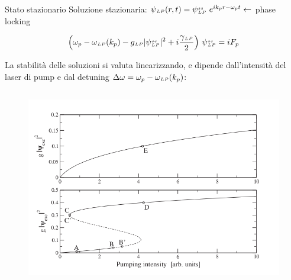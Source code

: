 \documentclass[10pt]{beamer}
\begin{document}
\begin{frame}{Stato stazionario}
%
Soluzione stazionaria: \( \psi{\scriptstyle _{LP}}(r,t) = \psi{\scriptstyle ^{ss}_{LP}} \ e^{ik_pr - \omega_p t}  \leftarrow\) \alert{phase locking}

\[
 \left( \omega_p - \omega{\scriptstyle _{LP}} (k_p) - g{\scriptstyle _{LP}} |\psi{\scriptstyle ^{ss}_{LP}}|^2 + i \frac{\gamma{\scriptstyle _{LP}}}{2} \right)\, \psi{\scriptstyle ^{ss}_{LP}} = i F_p
\]



\begin{figure}
 
\end{figure}

La stabilità delle soluzioni si valuta linearizzando, e dipende dall'intensità del laser di pump e dal detuning \(\Delta \omega = \omega_p - \omega{\scriptstyle _{LP}}(k_p)\):
\begin{columns}[t]
 \begin{column}{.5\textwidth}
  \begin{figure}
   \includegraphics[width=\columnwidth]{files/Shapevspump.png}
  \end{figure}

 \end{column}


\end{columns}
\end{frame}
\end{document}
